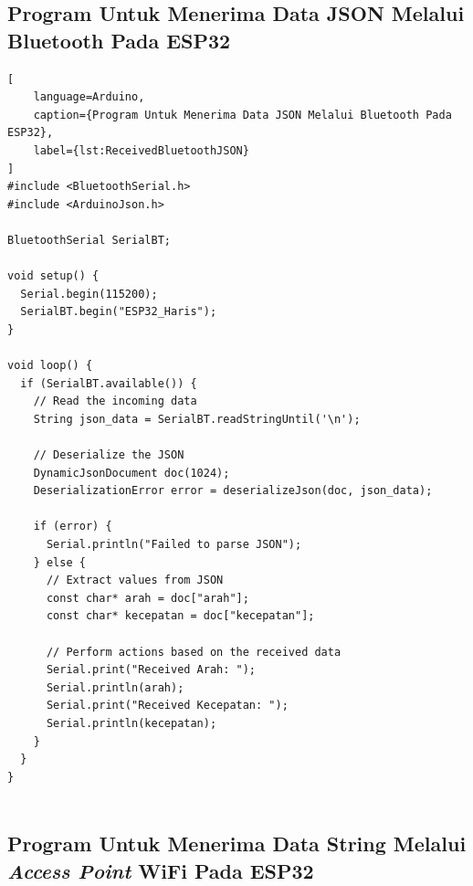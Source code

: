 \subsection*{Program Untuk Menerima Data JSON Melalui Bluetooth Pada ESP32}

\begin{lstlisting}[
    language=Arduino,
    caption={Program Untuk Menerima Data JSON Melalui Bluetooth Pada ESP32},
    label={lst:ReceivedBluetoothJSON}
]
#include <BluetoothSerial.h>
#include <ArduinoJson.h>

BluetoothSerial SerialBT;

void setup() {
  Serial.begin(115200);
  SerialBT.begin("ESP32_Haris");
}

void loop() {
  if (SerialBT.available()) {
    // Read the incoming data
    String json_data = SerialBT.readStringUntil('\n');

    // Deserialize the JSON
    DynamicJsonDocument doc(1024);
    DeserializationError error = deserializeJson(doc, json_data);

    if (error) {
      Serial.println("Failed to parse JSON");
    } else {
      // Extract values from JSON
      const char* arah = doc["arah"];
      const char* kecepatan = doc["kecepatan"];

      // Perform actions based on the received data
      Serial.print("Received Arah: ");
      Serial.println(arah);
      Serial.print("Received Kecepatan: ");
      Serial.println(kecepatan);
    }
  }
}
    
\end{lstlisting}

\subsection*{Program Untuk Menerima Data String Melalui \emph{Access Point} WiFi Pada ESP32}



